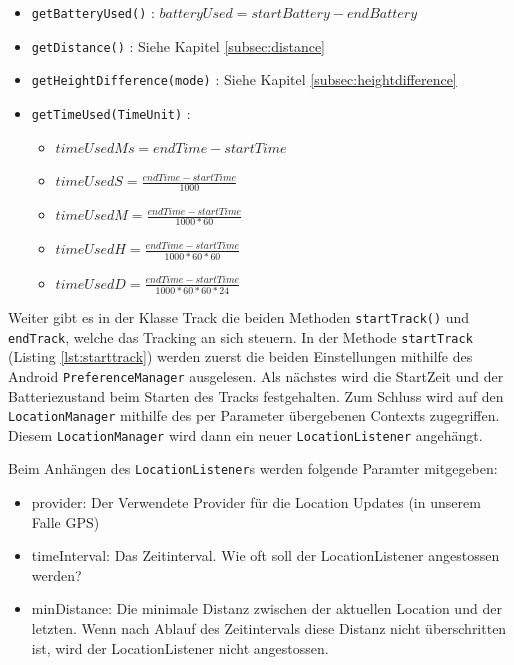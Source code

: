 \begin{itemize}
\item \lstinline$getBatteryUsed()$ : $batteryUsed = startBattery-endBattery$ 
\item \lstinline$getDistance()$ : Siehe Kapitel \ref{subsec:distance}
\item \lstinline$getHeightDifference(mode)$ : Siehe Kapitel \ref{subsec:heightdifference}
\item \lstinline$getTimeUsed(TimeUnit)$ :
\begin{itemize}
	\item $timeUsedMs = endTime-startTime$
	\item $timeUsedS = \frac{endTime-startTime}{1000}$
	\item $timeUsedM = \frac{endTime-startTime}{1000*60}$
	\item $timeUsedH = \frac{endTime-startTime}{1000*60*60}$
	\item $timeUsedD = \frac{endTime-startTime}{1000*60*60*24}$
\end{itemize}
\end{itemize}

Weiter gibt es in der Klasse Track die beiden Methoden \lstinline$startTrack()$ und \lstinline$endTrack$, welche das Tracking an sich steuern. In der Methode \lstinline$startTrack$ (Listing \ref{lst:starttrack}) werden zuerst die beiden Einstellungen mithilfe des Android \lstinline$PreferenceManager$ ausgelesen. Als nächstes wird die StartZeit und der Batteriezustand beim Starten des Tracks festgehalten. Zum Schluss wird auf den \lstinline$LocationManager$ mithilfe des per Parameter übergebenen Contexts zugegriffen. Diesem \lstinline$LocationManager$ wird dann ein neuer \lstinline$LocationListener$ angehängt.

Beim Anhängen des \lstinline$LocationListener$s werden folgende Paramter mitgegeben: 
\begin{itemize}
	\item provider: Der Verwendete Provider für die Location Updates (in unserem Falle GPS)
	\item timeInterval: Das Zeitinterval. Wie oft soll der LocationListener angestossen werden?
	\item minDistance: Die minimale Distanz zwischen der aktuellen Location und der letzten. Wenn nach Ablauf des Zeitintervals diese Distanz nicht überschritten ist, wird der LocationListener nicht angestossen. \cite{locationmanager}
\end{itemize}

